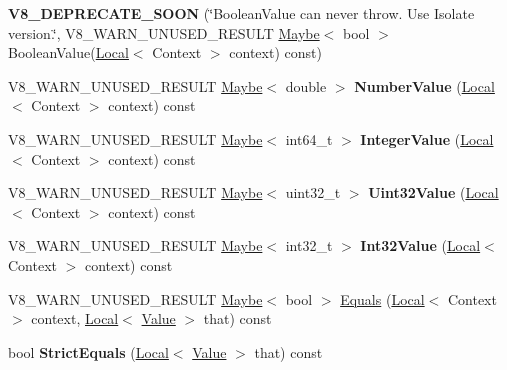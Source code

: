\begin{DoxyCompactItemize}
{\bfseries V8\+\_\+\+D\+E\+P\+R\+E\+C\+A\+T\+E\+\_\+\+S\+O\+ON} (\char`\"{}Boolean\+Value can never throw. Use Isolate version.\char`\"{}, V8\+\_\+\+W\+A\+R\+N\+\_\+\+U\+N\+U\+S\+E\+D\+\_\+\+R\+E\+S\+U\+LT \mbox{\hyperlink{classv8_1_1Maybe}{Maybe}}$<$ bool $>$ Boolean\+Value(\mbox{\hyperlink{classv8_1_1Local}{Local}}$<$ Context $>$ context) const)
\item 
\mbox{\label{classv8_1_1Value_ab68edf2318678446ffe2da0f56b6b853}} 
V8\+\_\+\+W\+A\+R\+N\+\_\+\+U\+N\+U\+S\+E\+D\+\_\+\+R\+E\+S\+U\+LT \mbox{\hyperlink{classv8_1_1Maybe}{Maybe}}$<$ double $>$ {\bfseries Number\+Value} (\mbox{\hyperlink{classv8_1_1Local}{Local}}$<$ Context $>$ context) const
\item 
\mbox{\label{classv8_1_1Value_a939383a1e62d9ae150693147050e712c}} 
V8\+\_\+\+W\+A\+R\+N\+\_\+\+U\+N\+U\+S\+E\+D\+\_\+\+R\+E\+S\+U\+LT \mbox{\hyperlink{classv8_1_1Maybe}{Maybe}}$<$ int64\+\_\+t $>$ {\bfseries Integer\+Value} (\mbox{\hyperlink{classv8_1_1Local}{Local}}$<$ Context $>$ context) const
\item 
\mbox{\label{classv8_1_1Value_a134829c7f91e19cc371ad8fc4dea24e2}} 
V8\+\_\+\+W\+A\+R\+N\+\_\+\+U\+N\+U\+S\+E\+D\+\_\+\+R\+E\+S\+U\+LT \mbox{\hyperlink{classv8_1_1Maybe}{Maybe}}$<$ uint32\+\_\+t $>$ {\bfseries Uint32\+Value} (\mbox{\hyperlink{classv8_1_1Local}{Local}}$<$ Context $>$ context) const
\item 
\mbox{\label{classv8_1_1Value_a30efd67e1154427a8995d6b130c47e76}} 
V8\+\_\+\+W\+A\+R\+N\+\_\+\+U\+N\+U\+S\+E\+D\+\_\+\+R\+E\+S\+U\+LT \mbox{\hyperlink{classv8_1_1Maybe}{Maybe}}$<$ int32\+\_\+t $>$ {\bfseries Int32\+Value} (\mbox{\hyperlink{classv8_1_1Local}{Local}}$<$ Context $>$ context) const
\item 
V8\+\_\+\+W\+A\+R\+N\+\_\+\+U\+N\+U\+S\+E\+D\+\_\+\+R\+E\+S\+U\+LT \mbox{\hyperlink{classv8_1_1Maybe}{Maybe}}$<$ bool $>$ \mbox{\hyperlink{classv8_1_1Value_a7d6045d6333598e79c9ab7d2898a9eb5}{Equals}} (\mbox{\hyperlink{classv8_1_1Local}{Local}}$<$ Context $>$ context, \mbox{\hyperlink{classv8_1_1Local}{Local}}$<$ \mbox{\hyperlink{classv8_1_1Value}{Value}} $>$ that) const
\item 
\mbox{\label{classv8_1_1Value_aca359114a4beedaf2858254013d0279e}} 
bool {\bfseries Strict\+Equals} (\mbox{\hyperlink{classv8_1_1Local}{Local}}$<$ \mbox{\hyperlink{classv8_1_1Value}{Value}} $>$ that) const

\end{DoxyCompactItemize}
